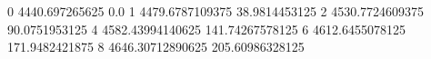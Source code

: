 0 4440.697265625 0.0
1 4479.6787109375 38.9814453125
2 4530.7724609375 90.0751953125
4 4582.43994140625 141.74267578125
6 4612.6455078125 171.9482421875
8 4646.30712890625 205.60986328125
